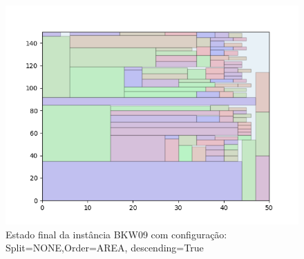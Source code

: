 \begin{figure}[H]
    \centering
    \caption[]{Estado final da instância BKW09 com configuração: Split=NONE,Order=AREA, descending=True}
    \label{fig:bkw09-none-area-true}
    \includegraphics[scale=0.5]{output/figures/bkw/bkw09/none/area/true/000}
\end{figure}